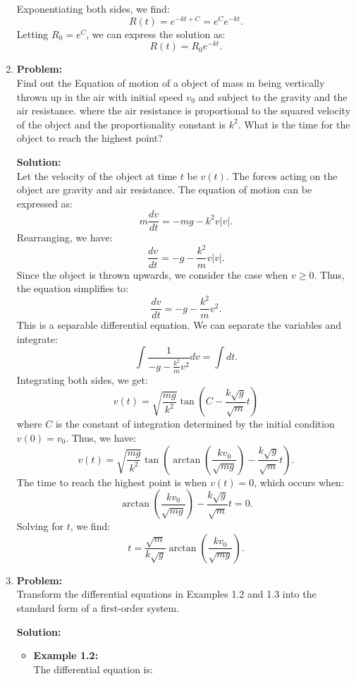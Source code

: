 \documentclass[12pt]{article}
\begin{document}
\begin{enumerate}[label=\textbf{Exercise \arabic*:}]
    Exponentiating both sides, we find:
    $$R(t) = e^{-kt+C} = e^C e^{-kt}.$$
    Letting $R_0 = e^C$, we can express the solution as:
    $$R(t) = R_0 e^{-kt}.$$

    \item 
    \textbf{Problem:} \\

    Find out the Equation of motion of a object of mass m being vertically thrown up in the 
    air with initial speed $v_0$ and subject to the gravity and the air resistance. where the
    air resistance is proportional to the squared velocity of the object and the proportionality 
    constant is $k^2$. What is the time for the object to reach the highest point?

    \textbf{Solution:} \\
    Let the velocity of the object at time $t$ be $v(t)$. The forces acting on the object are gravity and air resistance. The equation of motion can be expressed as:
    $$m\frac{dv}{dt} = -mg - k^2 v|v|.$$
    Rearranging, we have:
    $$\frac{dv}{dt} = -g - \frac{k^2}{m} v|v|.$$ 
    Since the object is thrown upwards, we consider the case when $v \geq 0$. Thus, the equation simplifies to:
    $$\frac{dv}{dt} = -g - \frac{k^2}{m} v^2.$$
    This is a separable differential equation. We can separate the variables and integrate:
    $$\int \frac{1}{-g - \frac{k^2}{m} v^2} dv = \int dt.$$
    Integrating both sides, we get:
    $$v(t) = \sqrt{\frac{mg}{k^2}} \tan (C-\frac{k\sqrt{g}}{\sqrt{m}}t)$$
    where $C$ is the constant of integration determined by the initial condition $v(0) = v_0$.
    Thus, we have:
    $$v(t) = \sqrt{\frac{mg}{k^2}} \tan (\arctan(\frac{k v_0}{\sqrt{mg}})-\frac{k\sqrt{g}}{\sqrt{m}}t).$$
    The time to reach the highest point is when $v(t) = 0$, which occurs when:
    $$\arctan(\frac{k v_0}{\sqrt{mg}})-\frac{k\sqrt{g}}{\sqrt{m}}t = 0.$$
    Solving for $t$, we find:
    $$t = \frac{\sqrt{m}}{k\sqrt{g}} \arctan(\frac{k v_0}{\sqrt{mg}}).$$
    

    \item
    \textbf{Problem:} \\
    Transform the differential equations in Examples 1.2 and 1.3 into the standard form of a first-order system.

    \textbf{Solution:} \\
    \begin{itemize}
        \item \textbf{Example 1.2:} \\
        The differential equation is:


\end{itemize}
\end{enumerate}
\end{document}
